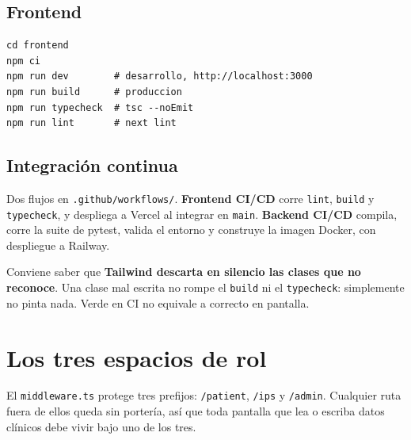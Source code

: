 \documentclass[11pt,a4paper]{article}
\begin{document}
\subsection{Frontend}

\begin{lstlisting}
cd frontend
npm ci
npm run dev        # desarrollo, http://localhost:3000
npm run build      # produccion
npm run typecheck  # tsc --noEmit
npm run lint       # next lint
\end{lstlisting}

\subsection{Integración continua}

Dos flujos en \texttt{.github/workflows/}. \textbf{Frontend CI/CD} corre
\texttt{lint}, \texttt{build} y \texttt{typecheck}, y despliega a Vercel al
integrar en \texttt{main}. \textbf{Backend CI/CD} compila, corre la suite de
pytest, valida el entorno y construye la imagen Docker, con despliegue a
Railway.

Conviene saber que \textbf{Tailwind descarta en silencio las clases que no
reconoce}. Una clase mal escrita no rompe el \texttt{build} ni el
\texttt{typecheck}: simplemente no pinta nada. Verde en CI no equivale a
correcto en pantalla.

\newpage
\section{Los tres espacios de rol}

El \texttt{middleware.ts} protege tres prefijos: \texttt{/patient},
\texttt{/ips} y \texttt{/admin}. Cualquier ruta fuera de ellos queda sin
portería, así que toda pantalla que lea o escriba datos clínicos debe vivir
bajo uno de los tres.
\end{document}
